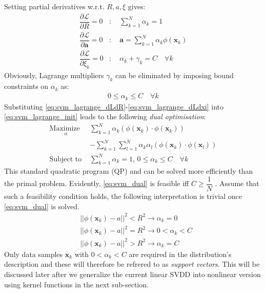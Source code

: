 \documentclass[conference]{IEEEtran}
\theoremstyle{problemstyle}
\begin{document}
Setting partial derivatives w.r.t. $R, a, \xi$ gives:
\begin{subequations}
\begin{align}
\dfrac{\partial \mathcal{L}}{\partial R} = 0 &: \quad \sum_{k=1}^N \alpha_k = 1 \label{eq:svm_lagrange_dLdR} \\
\dfrac{\partial \mathcal{L}}{\partial \mathbf{a}} = 0 &: \quad \mathbf{a} = \sum_{k=1}^N \alpha_k \phi \left( \mathbf{x}_k \right) \label{eq:svm_lagrange_dLda} \\
\dfrac{\partial \mathcal{L}}{\partial \xi_k} = 0 &: \quad \alpha_k + \gamma_k = C \quad \forall k \label{eq:svm_lagrange_dLdxi}
\end{align}
\end{subequations}
Obviously, Lagrange multipliers $\gamma_k$ can be eliminated by imposing bound constraints on $\alpha_k$ as:
\begin{align}
0\le \alpha_k \le C \quad \forall k
\end{align}
Substituting \eqref{eq:svm_lagrange_dLdR}-\eqref{eq:svm_lagrange_dLdxi} into \eqref{eq:svm_lagrange_init} leads to the following \emph{dual optimisation}:
\begin{subequations}\label{eq:svm_dual}
\begin{align}
\underset{
	\begin{array}{c}
		 \alpha
	\end{array}}{\text{Maximize }} &\sum_{k=1}^N \alpha_k \left( \phi \left( \mathbf{x}_k \right) \cdot \phi \left( \mathbf{x}_k \right) \right) \nonumber \\&- \sum_{k=1}^N \sum_{l=1}^N \alpha_k \alpha_l \left( \phi \left( \mathbf{x}_k \right) \cdot \phi \left( \mathbf{x}_l \right) \right) \\
\text{Subject to } &\sum_{k=1}^N \alpha_k = 1 \text{, } 0 \le \alpha_k \le C \quad \forall k
\end{align}
\end{subequations}
This standard quadratic program (QP) and can be solved more efficiently than the primal problem. Evidently, \eqref{eq:svm_dual} is feasible iff $C \ge \dfrac{1}{N}$ \cite{chang2013revisit}. Assume that such a feasibility condition holds, the following interpretation is trivial once \eqref{eq:svm_dual} is solved.
\begin{subequations}
\begin{align}
&\left|\left| \phi \left( \mathbf{x}_k \right) - a \right|\right|^2 < R^2 \to \alpha_k = 0 \\
&\left|\left| \phi \left( \mathbf{x}_k \right) - a \right|\right|^2 = R^2 \to 0 < \alpha_k < C \label{eq:sv_alpha}\\
&\left|\left| \phi \left( \mathbf{x}_k \right) - a \right|\right|^2 > R^2 \to \alpha_k = C
\end{align}
\end{subequations}
Only data samples $\mathbf{x}_k$ with $0 < \alpha_k < C$ are required in the distribution's description and these will therefore be refrered to as \emph{support vectors}. This will be discussed later after we generalize the current linear SVDD into nonlinear version using kernel functions in the next sub-section. 
\end{document}
